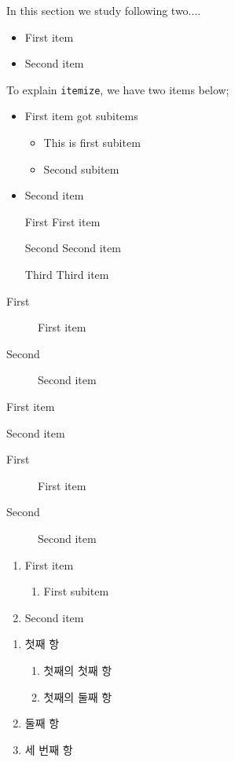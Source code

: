 \documentclass[11pt]{article}
\begin{document}
In this section we study following two....
\begin{itemize}
\item First item
\item Second item
\end{itemize}

To explain \texttt{itemize}, we have two items below;
\begin{itemize}
\item First item got subitems
\begin{itemize}
\item This is first subitem
\item Second subitem
\end{itemize}
\item Second item
\end{itemize}

\begin{itemize}
\item[First] First item
\item[Second] Second item
\item[Third] Third item
\end{itemize}

\begin{description}
\item[First] First item
\item[Second] Second item
\end{description}

\begin{description}
\item First item
\item Second item
\end{description}

\begin{description}
\item[First] First item
\item[Second] Second item
\end{description}

\begin{enumerate}
\item First item
\begin{enumerate}
\item First subitem
\end{enumerate}
\item Second item
\end{enumerate}

\begin{enumerate}
\item 첫째 항
\begin{enumerate}
\item 첫째의 첫째 항
\item 첫째의 둘째 항
\end{enumerate}
\item 둘째 항
\item 세 번째 항
\end{enumerate}
\end{document}
